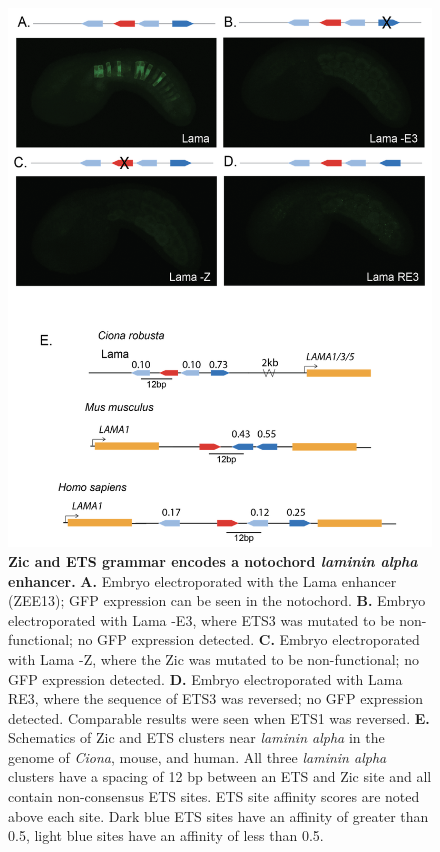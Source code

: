 \begin{figure}[p]
    \centering
    \includegraphics[scale=.52]{2_figures-and-files/Fig4_Laminin-alpha-Enhancer.png}
    \caption[Zic and ETS grammar encodes a notochord \textit{laminin alpha} enhancer]{\textbf{Zic and ETS grammar encodes a notochord \textit{laminin alpha} enhancer.} \textbf{A.} Embryo electroporated with the Lama enhancer (ZEE13); GFP expression can be seen in the notochord. \textbf{B.} Embryo electroporated with Lama -E3, where ETS3 was mutated to be non-functional; no GFP expression detected. \textbf{C.} Embryo electroporated with Lama -Z, where the Zic was mutated to be non-functional; no GFP expression detected. \textbf{D.} Embryo electroporated with Lama RE3, where the sequence of ETS3 was reversed; no GFP expression detected. Comparable results were seen when ETS1 was reversed. \textbf{E.} Schematics of Zic and ETS clusters near \textit{laminin alpha}  in the genome of \textit{Ciona}, mouse, and human. All three \textit{laminin alpha}  clusters have a spacing of 12 bp between an ETS and Zic site and all contain non-consensus ETS sites. ETS site affinity scores are noted above each site. Dark blue ETS sites have an affinity of greater than 0.5, light blue sites have an affinity of less than 0.5.}
    \label{fig:4 laminin alpha enhancer}
\end{figure}

